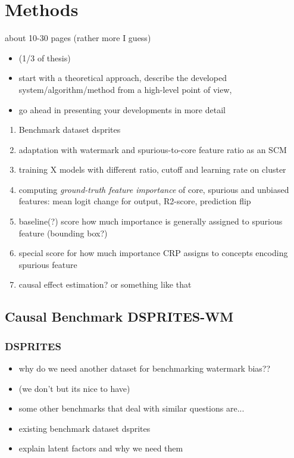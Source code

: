 \chapter{Methods}\label{chapter:method}

{ \color{red}

about 10-30 pages (rather more I guess)

    \begin{itemize}
        \item (1/3 of thesis)
        \item start with a theoretical approach, describe the developed system/algorithm/method from a high-level point of view,
        \item go ahead in presenting your developments in more detail
    \end{itemize}
}


\begin{enumerate}
    \item Benchmark dataset dsprites
    \item adaptation with watermark and spurious-to-core feature ratio as an SCM
    \item training X models with different ratio, cutoff and learning rate on cluster
    \item computing \textit{ground-truth feature importance} of core, spurious and unbiased features: mean logit change for output, R2-score,  prediction flip
    \item baseline(?) score how much importance is generally assigned to spurious feature (bounding box?)
    \item special score for how much importance CRP assigns to concepts encoding spurious feature
    \item causal effect estimation? or something like that
\end{enumerate}




\section{Causal Benchmark DSPRITES-WM}

\subsection{DSPRITES}

\begin{itemize}
    \item why do we need another dataset for benchmarking watermark bias??
    \item (we don't but its nice to have)
    \item some other benchmarks that deal with similar questions are...
    \item existing benchmark dataset dsprites \cite{dsprites17}
    \item explain latent factors and why we need them
\end{itemize}

